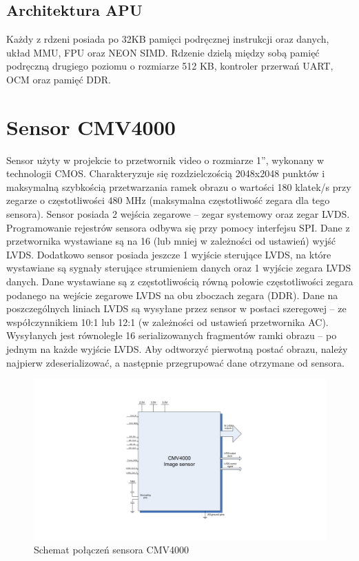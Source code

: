 \documentclass[a4paper,11pt,oneside]{book}  %
\begin{document}
\subsection{Architektura APU}
Każdy z rdzeni posiada po 32KB pamięci podręcznej instrukcji oraz danych, układ MMU, FPU oraz NEON SIMD. Rdzenie dzielą między sobą pamięć podręczną drugiego poziomu o rozmiarze 512 KB, kontroler przerwań UART, OCM oraz pamięć DDR.
\section{Sensor CMV4000}
Sensor użyty w projekcie to przetwornik video o rozmiarze 1”, wykonany w technologii CMOS. Charakteryzuje się rozdzielczością 2048x2048 punktów i maksymalną szybkością przetwarzania ramek obrazu o wartości 180 klatek/s przy zegarze o częstotliwości 480 MHz (maksymalna częstotliwość zegara dla tego sensora). Sensor posiada 2 wejścia zegarowe – zegar systemowy oraz zegar LVDS. Programowanie rejestrów sensora odbywa się przy pomocy interfejsu SPI. Dane z przetwornika wystawiane są na 16 (lub mniej w zależności od ustawień) wyjść LVDS. Dodatkowo sensor posiada jeszcze 1 wyjście sterujące LVDS, na które wystawiane są sygnały sterujące strumieniem danych oraz 1 wyjście zegara LVDS danych. Dane wystawiane są z częstotliwością równą połowie częstotliwości zegara podanego na wejście zegarowe LVDS na obu zboczach zegara (DDR). Dane na poszczególnych liniach LVDS są wysyłane przez sensor w postaci szeregowej – ze współczynnikiem 10:1 lub 12:1 (w zależności od ustawień przetwornika AC). Wysyłanych jest równolegle 16 serializowanych fragmentów ramki obrazu – po jednym na każde wyjście LVDS. Aby odtworzyć pierwotną postać obrazu, należy najpierw zdeserializować, a następnie przegrupować dane otrzymane od sensora.

\begin{figure}[H]
	\centering
	\includegraphics[width=18cm]{cmv4000.png}
	\caption{Schemat połączeń sensora CMV4000}
	\label{fig:CMV4000}
\end{figure}
\end{document}
